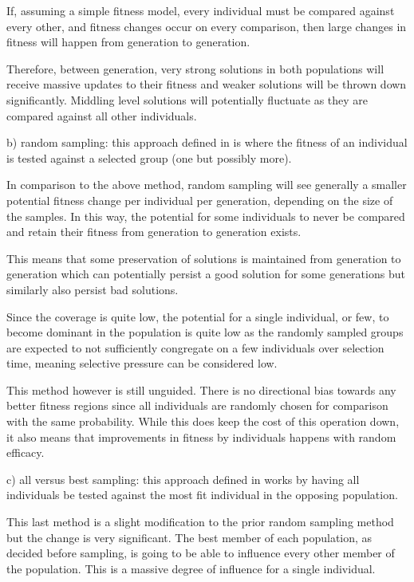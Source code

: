 \documentclass[12pt]{article}
\begin{document}
	If, assuming a simple fitness model, every individual must be compared against every other, and fitness changes occur on every comparison, then large changes in fitness will happen from generation to generation. 

	Therefore, between generation, very strong solutions in both populations will receive massive updates to their fitness and weaker solutions will be thrown down significantly. Middling level solutions will potentially fluctuate as they are compared against all other individuals. 

	b) random sampling: this approach defined in \cite{REED1967319} is where the fitness of an individual is tested against a selected group (one but possibly more).

	In comparison to the above method, random sampling will see generally a smaller potential fitness change per individual per generation, depending on the size of the samples. In this way, the potential for some individuals to never be compared and retain their fitness from generation to generation exists. 

	This means that some preservation of solutions is maintained from generation to generation which can potentially persist a good solution for some generations but similarly also persist bad solutions.

	Since the coverage is quite low, the potential for a single individual, or few, to become dominant in the population is quite low as the randomly sampled groups are expected to not sufficiently congregate on a few individuals over selection time, meaning selective pressure can be considered low.

	This method however is still unguided. There is no directional bias towards any better fitness regions since all individuals are randomly chosen for comparison with the same probability. While this does keep the cost of this operation down, it also means that improvements in fitness by individuals happens with random efficacy.

	c) all versus best sampling: this approach defined in \cite{Sims1994} works by having all individuals be tested against the most fit individual in the opposing population.

	This last method is a slight modification to the prior random sampling method but the change is very significant. The best member of each population, as decided before sampling, is going to be able to influence every other member of the population. This is a massive degree of influence for a single individual. 
\end{document}
